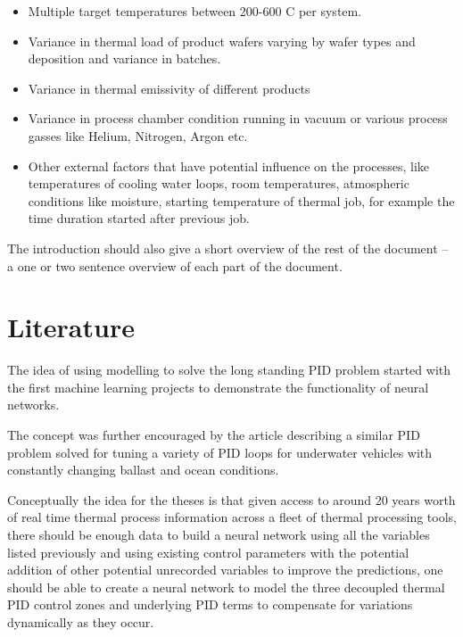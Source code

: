     \begin{itemize}
      \item Multiple target temperatures between 200-600 \degree C per system.
      \item Variance in thermal load of product wafers varying by wafer types and 
      deposition and variance in batches. 
      \item Variance in thermal emissivity of diﬀerent products
      \item Variance in process chamber condition running in vacuum or various process 
      gasses like Helium, Nitrogen, Argon etc. 
      \item Other external factors that have potential inﬂuence on the processes, 
      like temperatures of cooling water loops, room temperatures, atmospheric conditions 
      like moisture, starting temperature of thermal job, for example the time duration 
      started after previous job.
    \end{itemize}

    
    The introduction should also give a short overview of the rest of the
    document -- a one or two sentence overview of each part of the document.

  \section{Literature}
    The idea of using modelling to solve the long standing PID problem started with 
    the first machine learning projects to demonstrate the functionality of neural networks.
    
    The concept was further encouraged by the article describing a similar PID problem 
    solved for tuning a variety of PID loops for underwater vehicles with constantly 
    changing ballast and ocean conditions.~\cite{ArticleUnderwatervehicle}

    Conceptually the idea for the theses is that given access to around 20 years 
    worth of real time  thermal process information across a fleet of thermal 
    processing tools, there should be enough data 
    to build a neural network using all the variables listed previously and using 
    existing control parameters with the potential addition of other potential 
    unrecorded variables to improve the predictions, one should be able to create a 
    neural network to model the three decoupled thermal PID control zones and underlying 
    PID terms to compensate for variations dynamically as they occur.
   
